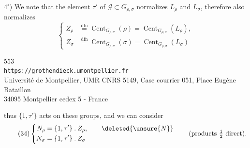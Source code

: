 $4^\circ)$ We  note that the element $\tau'$ of
 $\mathcal G\subset G_{\rho,\sigma}$
normalizes $L_\rho$ and $L_\sigma$, therefore also normalizes
\[
\tag{33}
\left\{\begin{aligned}
Z_\rho&\overset{\mathrm{dfn}}=\operatorname{Cent}_{G_{\rho,\sigma}}(\rho)
=\operatorname{Cent}_{G_{\rho,\sigma}}(L_\rho),\\
Z_\sigma&\overset{\mathrm{dfn}}=\operatorname{Cent}_{G_{\rho,\sigma}}(\sigma)
=\operatorname{Cent}_{G_{\rho,\sigma}}(L_\sigma)
\end{aligned}\right.
\]

{\small
\begin{center}
553\\
\texttt{https://grothendieck.umontpellier.fr}\\
Université de Montpellier, UMR CNRS 5149, Case courrier 051, Place Eugène Bataillon\\
34095 Montpellier cedex 5 - France
\end{center}
}


thus $\{1,\tau'\}$ acts on these groups, and we can consider
\[
\tag{34}
\left\{\begin{aligned}
N_\rho&=\{1,\tau'\}\mathbin{.}Z_\rho,\qquad\deleted{\unsure{N}}\\
N_\sigma&=\{1,\tau'\}\mathbin{.}Z_\sigma
\end{aligned}\right.
\qquad(\text{products }\tfrac12\text{ direct}).
\]

